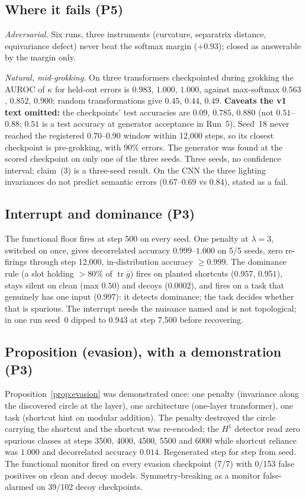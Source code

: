 \documentclass[11pt]{article}
\newcommand{\tr}{\operatorname{tr}}
\begin{document}
\subsection{Where it fails (P5)}\label{sec:p5}
\emph{Adversarial.} Six runs, three instruments (curvature, separatrix distance, equivariance defect) never beat the softmax margin ($+0.93$); closed as answerable by the margin only.

\emph{Natural, mid-grokking.} On three transformers checkpointed during grokking the AUROC of $\kappa$ for held-out errors is $0.983$, $1.000$, $1.000$, against max-softmax $0.563$, $0.852$, $0.900$; random transformations give $0.45$, $0.44$, $0.49$. \textbf{Caveats the v1 text omitted:} the checkpoints' test accuracies are $0.09$, $0.785$, $0.880$ (not $0.51$--$0.88$; $0.51$ is a test accuracy at generator acceptance in Run~5). Seed~18 never reached the registered $0.70$--$0.90$ window within 12{,}000 steps, so its closest checkpoint is pre-grokking, with $90\%$ errors. The generator was found at the scored checkpoint on only one of the three seeds. Three seeds, no confidence interval; claim~(3) is a three-seed result. On the CNN the three lighting invariances do not predict semantic errors ($0.67$--$0.69$ vs $0.84$), stated as a fail.

\subsection{Interrupt and dominance (P3)}
The functional floor fires at step 500 on every seed. One penalty at $\lambda=3$, switched on once, gives decorrelated accuracy $0.999$--$1.000$ on 5/5 seeds, zero re-firings through step 12{,}000, in-distribution accuracy $\ge0.999$. The dominance rule (a slot holding $>80\%$ of $\tr\bar g$) fires on planted shortcuts ($0.957$, $0.951$), stays silent on clean (max $0.50$) and decoys ($0.0002$), and fires on a task that genuinely has one input ($0.997$): it detects dominance; the task decides whether that is spurious. The interrupt needs the nuisance named and is not topological; in one run seed~0 dipped to $0.943$ at step 7{,}500 before recovering.

\subsection{Proposition (evasion), with a demonstration (P3)}\label{sec:evasion}
Proposition~\ref{prop:evasion} was demonstrated once: one penalty (invariance along the discovered circle at the layer), one architecture (one-layer transformer), one task (shortcut hint on modular addition). The penalty destroyed the circle carrying the shortcut and the shortcut was re-encoded; the $H^1$ detector read zero spurious classes at steps 3500, 4000, 4500, 5500 and 6000 while shortcut reliance was $1.000$ and decorrelated accuracy $0.014$. Regenerated step for step from seed. The functional monitor fired on every evasion checkpoint (7/7) with 0/153 false positives on clean and decoy models. Symmetry-breaking as a monitor false-alarmed on 39/102 decoy checkpoints.
\end{document}
